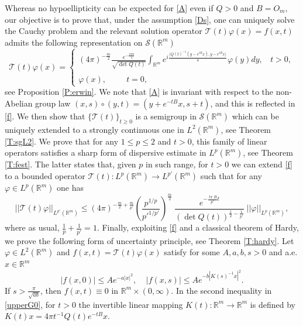 \documentclass[11pt,a4paper]{amsart}
\def \vf{\varphi}
\def \So {\mathscr{S}(\Rm)}
\newcommand{\Rm}{\mathbb R^m}
\numberwithin{equation}{section}
\newcommand{\tr}{\operatorname{tr}}
\newcommand{\sa}{\langle}
\newcommand{\da}{\rangle}
\numberwithin{equation}{section}
\begin{document}
Whereas no hypoellipticity can be expected for \eqref{A} even if $Q>0$ and $B = O_m$, our objective is to prove that, under the assumption \eqref{Ds}, one can uniquely solve the Cauchy problem and the relevant solution operator $\mathcal T(t) \vf(x) = f(x,t)$ admits the following representation on $\So$ 
\begin{equation}\label{f}
\mathcal T(t) \vf(x)  = \begin{cases}
(4\pi
)^{-\frac{m}{2}} \frac{e^{-\frac{i \pi m}4}}{\sqrt{\det Q(t)}}   \int_{\Rm} e^{i \frac{\sa Q(t)^{-1}(y-e^{tB}x),y-e^{tB}x\da}{4}} \vf(y) dy,\ \ \ \ t>0,
\\
\\
\vf(x),\ \ \ \ \ \ \ \ \ \ \  t = 0,
\end{cases}
\end{equation}
see Proposition \ref{P:erwin}. We note that \eqref{A} is invariant with respect to the non-Abelian group law
$(x,s)\circ (y,t) = (y+ e^{-tB}x,s+t)$, and this is reflected in \eqref{f}.
We then show that $\{\mathcal T(t)\}_{t\ge 0}$ is a semigroup in $\So$ which can be uniquely extended to a strongly continuous one in $L^2(\Rm)$, see Theorem \ref{T:sgL2}. We prove that for any $1\le p \le 2$ and $t>0$, this family of linear operators satisfies a sharp form of dispersive estimate in $L^p(\Rm)$, see Theorem \ref{T:fest}. The latter states that, given $p$ in such range, for $t>0$ we can extend \eqref{f} to a  bounded operator $\mathcal T(t) : L^p(\Rm)\to L^{p'}(\Rm)$ such that for any $\vf\in L^p(\Rm)$ one has
\begin{equation}\label{fe0}
||\mathcal T(t) \vf||_{L^{p'}(\Rm)} \le (4\pi
)^{-\frac{m}{2}+\frac{m}{p'}} \left(\frac{p^{1/p}}{{p'}^{1/p'}}\right)^{\frac m2} \ \frac{e^{-\frac{\tr B}{p'} t}}{(\det Q(t))^{\frac 12 - \frac 1{p'}}}\ ||\vf||_{L^p(\Rm)},
\end{equation} 
where as usual, $\frac 1p + \frac 1{p'} = 1$. Finally, exploiting \eqref{f} and a classical theorem of Hardy, we prove the following form of uncertainty principle, see Theorem \ref{T:hardy}. Let $\vf\in L^2(\Rm)$ and $f(x,t)= \mathcal T(t) \vf(x)$ satisfy for some $A, a, b, s>0$ and a.e. $x\in \Rm$
\begin{equation}\label{upperG0}
|f(x,0)| \le A e^{-a |x|^2},\ \ \ \ \ |f(x,s)| \le A e^{-b |K(s)^{-1} x|^2}.
\end{equation}
If $s > \frac{\pi}{\sqrt{ab}}$,
then $f(x,t) \equiv 0$ in $\Rm\times (0,\infty)$. In the second inequality in \eqref{upperG0}, for $t>0$ the invertible linear mapping $K(t):\Rm\to \Rm$ is defined by $K(t) x = 4\pi t^{-1} Q(t) e^{-tB} x$.
\end{document}
